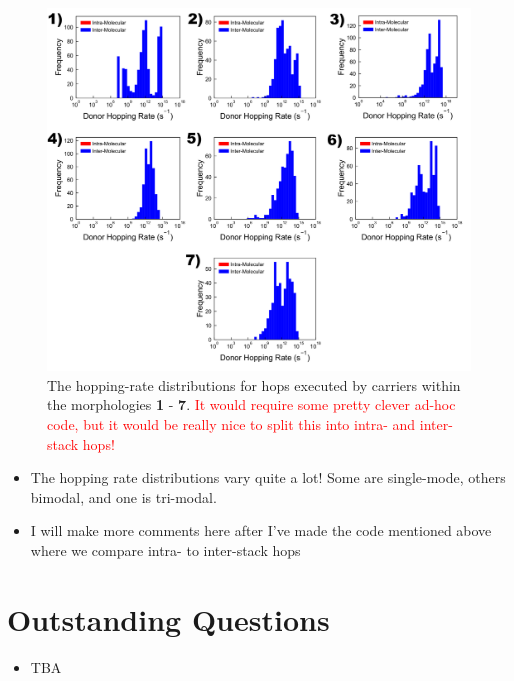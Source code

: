 \documentclass[12pt]{article}
\begin{document}
\begin{figure}[h!]\centering
	\includegraphics[width=\textwidth]{Figures/DonorHoppingRateMixed.pdf}
    \caption{The hopping-rate distributions for hops executed by carriers within the morphologies \textbf{1} - \textbf{7}.
    \textcolor{red}{It would require some pretty clever ad-hoc code, but it would be really nice to split this into intra- and inter-stack hops!}}
	\label{fig:HoppingRateMixed}
\end{figure}

\begin{itemize}
    \item{The hopping rate distributions vary quite a lot! Some are single-mode, others bimodal, and one is tri-modal.}
    \item{I will make more comments here after I've made the code mentioned above where we compare intra- to inter-stack hops}
\end{itemize}


\clearpage


\section{Outstanding Questions}


\begin{itemize}
    \item{TBA}
\end{itemize}




\end{document}
